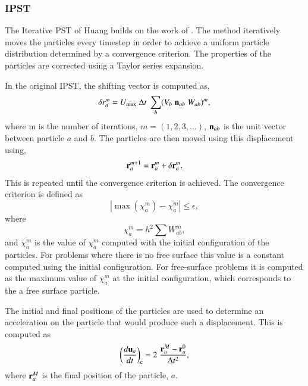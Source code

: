 \subsubsection{IPST}
\label{sec:ipst}

The Iterative PST of Huang \citep{huang_kernel_2019} builds on the work of
\cite{xu2009accuracy}. The method iteratively moves the particles every
timestep in order to achieve a uniform particle distribution determined by a
convergence criterion. The properties of the particles are corrected using a
Taylor series expansion.

In the original IPST, the shifting vector is computed as,
\begin{equation}
  \label{eq:ipst_step1}
  \delta r_a^m = U_{\max} \; \Delta t \; \sum_b (V_b \; \mathbf{n}_{ab} \; W_{ab})^m,
\end{equation}
where m is the number of iterations, $m=(1, 2, 3, \dots)$, $\mathbf{n}_{ab}$ is
the unit vector between particle $a$ and $b$. The particles are then moved
using this displacement using,
\begin{equation}
  \label{eq:ipst_step2}
  \mathbf{r}_a^{m+1} = \mathbf{r}_a^{m} + \delta \mathbf{r}_a^{m}.
\end{equation}
This is repeated until the convergence criterion is achieved. The convergence
criterion is defined as
\begin{equation}
  \label{eq:ipst_convergence_criterion}
  |\max(\chi_a^m) - \overline{\chi_a^m}| \leq \epsilon,
\end{equation}
where
\begin{equation}
  \label{eq:ipst_chi_0}
  \chi_a^m = h^2 \sum W^m_{ab},
\end{equation}
%
and $\overline{\chi_a^m}$ is the value of $\chi_a^m$ computed with the initial
configuration of the particles. For problems where there is no free surface
this value is a constant computed using the initial configuration. For
free-surface problems it is computed as the maximum value of $\chi_a^m$ at the
initial configuration, which corresponds to the a free surface particle.

The initial and final positions of the particles are used to determine an
acceleration on the particle that would produce such a displacement.  This is
computed as
\begin{equation}
  \label{eq:ipst_force}
  \bigg(\frac{d \mathbf{u}_a}{dt}\bigg)_{\text{c}} =
  2 \; \frac{\mathbf{r}_a^{M} - \mathbf{r}_a^0}{\Delta t^2},
\end{equation}
where $\mathbf{r}_a^M$ is the final position of the particle, $a$.



